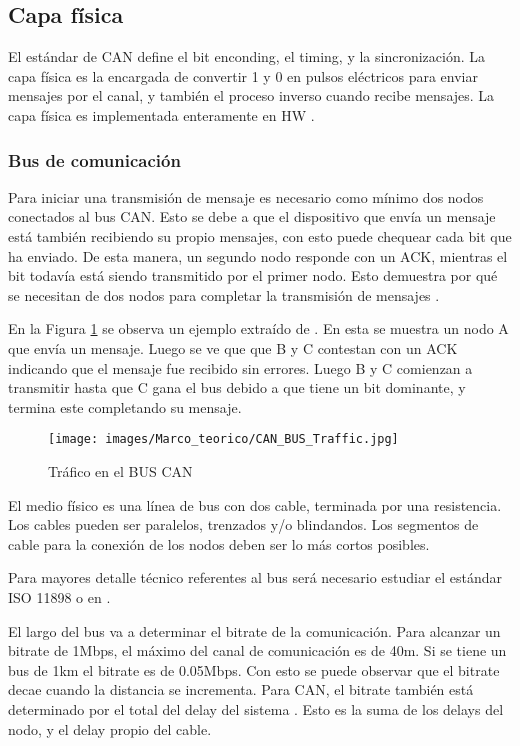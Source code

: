 \subsection{Capa física}\label{subsec:capafisca}
El estándar de CAN define el bit enconding, el timing, y la sincronización. La capa física es la encargada de convertir 1 y 0 en pulsos eléctricos para enviar mensajes por el canal, y también el proceso inverso cuando recibe mensajes. La capa física es implementada enteramente en \ac{HW} \citep{texasFISICACAN}.

\subsubsection{Bus de comunicación}
Para iniciar una transmisión de mensaje es necesario como mínimo dos nodos conectados al bus CAN. Esto se debe a que el dispositivo que envía un mensaje está también recibiendo su propio mensajes, con esto puede chequear cada bit que ha enviado. De esta manera, un segundo nodo responde con un ACK, mientras el bit todavía está siendo transmitido por el primer nodo. Esto demuestra por qué se necesitan de dos nodos para completar la transmisión de mensajes \citep{texasFISICACAN}.

En la Figura \ref{fig:traficBUSCAN} se observa un ejemplo extraído de \citep{texasFISICACAN}. En esta se muestra un nodo A que envía un mensaje. Luego se ve que que B y C contestan con un ACK indicando que el mensaje fue recibido sin errores. Luego B y C comienzan a transmitir hasta que C gana el bus debido a que tiene un bit dominante, y termina este completando su mensaje.

\begin{figure}[h]
 \centering
 \texttt{[image: images/Marco\_teorico/CAN\_BUS\_Traffic.jpg]}
  \caption{Tráfico en el BUS CAN}
\label{fig:traficBUSCAN}
\end{figure}

El medio físico  es una línea de bus con dos cable, terminada por una resistencia. Los cables pueden ser paralelos, trenzados y/o blindandos. Los segmentos de cable para la conexión de los nodos deben ser lo más cortos posibles.

Para mayores detalle técnico referentes al bus será necesario estudiar el estándar ISO 11898 o en \cite{texasFISICACAN}.

El largo del bus va a determinar el bitrate de la comunicación. Para alcanzar un bitrate de 1Mbps, el máximo del canal de comunicación es de 40m. Si se tiene un bus de 1km el bitrate es de 0.05Mbps. Con esto se puede observar que el bitrate decae cuando la distancia se incrementa. Para CAN, el bitrate también está determinado por el total del delay del sistema \citep{texasFISICACAN}. Esto es la suma de los delays del nodo, y el delay propio del cable.

